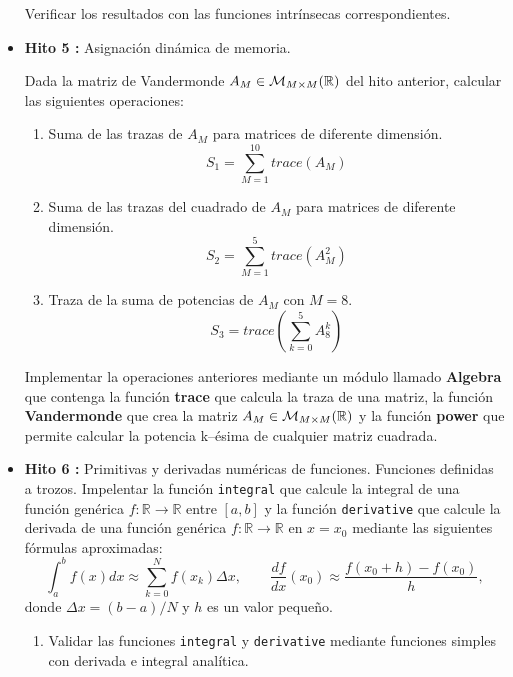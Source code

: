 \documentclass[12pt,spanish]{article}
\begin{document}
\begin{itemize}
Verificar los resultados con las funciones intrínsecas correspondientes. 


\item {\bf Hito 5 :}   Asignación dinámica de memoria.

Dada la matriz  de Vandermonde $A_M \in {\cal M}_{M \times M} (\mathbb{R})$ del hito anterior,
calcular las siguientes operaciones: 


\begin{enumerate}	
	\item Suma de las trazas de $ A_M $ para matrices de diferente dimensión. 
	$$  S_1 = \sum_{M=1} ^{10} trace(A_M) $$ 
	\item  Suma de las trazas del cuadrado de $ A_M $ para matrices de diferente dimensión. 
	$$  S_2 = \sum_{M=1} ^{5} trace(A_M^2) $$ 
	\item Traza de la suma de potencias de $ A_M $  con $ M=8 $.
	$$  S_3 = trace \left( \sum_{k=0} ^{5} A_8^k  \right) $$
\end{enumerate}  
 
Implementar la operaciones anteriores mediante un módulo llamado \textbf{Algebra} 
que contenga la función  \textbf{trace} que calcula la traza de una matriz, la 
función  \textbf{Vandermonde} que crea la matriz  $ A_M \in { \cal M } _{ M 
\times M } ( \mathbb{R} )$ 
 y la función \textbf{power} que permite calcular la potencia k--ésima de 
 cualquier matriz cuadrada. 

	
	  
	



\newpage

\item {\bf Hito 6 :}  Primitivas y derivadas numéricas de funciones.  Funciones 
definidas a trozos. Impelentar la función \texttt{integral} que calcule la 
integral de una función genérica $ f: \mathbb{R} \rightarrow \mathbb{R} $ entre 
$ [a, b] $ y la 
función  \texttt{derivative} que calcule la 
derivada de una función genérica $ f: \mathbb{R} \rightarrow \mathbb{R} $ en $ 
x = x_0 $ 
mediante las siguientes fórmulas aproximadas: 
$$
 \int _a ^b f(x)  dx \approx \sum_{k=0} ^N f(x_k) \Delta x, \qquad 
 \frac{df}{dx} ( x_0  ) \approx \frac{ f(x_0+h) - f(x_0) }{ h }, 
$$
donde  $  \Delta x = ( b- a) /N  $ y $ h $ es un valor pequeño. 
\begin{enumerate}


\item Validar las funciones \texttt{integral} y \texttt{derivative} mediante 
funciones simples con derivada e integral analítica.  


\end{enumerate}
\end{itemize}
\end{document}
